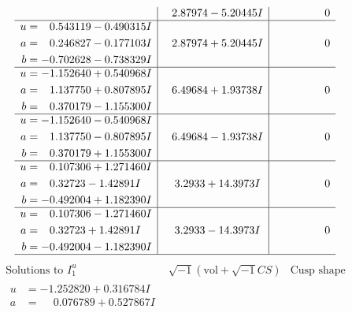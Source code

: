 \documentclass[1p]{elsarticle_modified}
\theoremstyle{definition}
\newcommand{\I}{\sqrt{-1}}
\begin{document}
$$\begin{array}{c|c|c}
 & \phantom{-}2.87974 - 5.20445 I & \phantom{-0.000000 } 0 \\ \hline\begin{aligned}
u &= \phantom{-}0.543119 - 0.490315 I \\
a &= \phantom{-}0.246827 - 0.177103 I \\
b &= -0.702628 - 0.738329 I\end{aligned}
 & \phantom{-}2.87974 + 5.20445 I & \phantom{-0.000000 } 0 \\ \hline\begin{aligned}
u &= -1.152640 + 0.540968 I \\
a &= \phantom{-}1.137750 + 0.807895 I \\
b &= \phantom{-}0.370179 - 1.155300 I\end{aligned}
 & \phantom{-}6.49684 + 1.93738 I & \phantom{-0.000000 } 0 \\ \hline\begin{aligned}
u &= -1.152640 - 0.540968 I \\
a &= \phantom{-}1.137750 - 0.807895 I \\
b &= \phantom{-}0.370179 + 1.155300 I\end{aligned}
 & \phantom{-}6.49684 - 1.93738 I & \phantom{-0.000000 } 0 \\ \hline\begin{aligned}
u &= \phantom{-}0.107306 + 1.271460 I \\
a &= \phantom{-}0.32723 - 1.42891 I \\
b &= -0.492004 + 1.182390 I\end{aligned}
 & \phantom{-}3.2933 + 14.3973 I & \phantom{-0.000000 } 0 \\ \hline\begin{aligned}
u &= \phantom{-}0.107306 - 1.271460 I \\
a &= \phantom{-}0.32723 + 1.42891 I \\
b &= -0.492004 - 1.182390 I\end{aligned}
 & \phantom{-}3.2933 - 14.3973 I & \phantom{-0.000000 } 0\\
 \hline 
 \end{array}$$\newpage$$\begin{array}{c|c|c}  
\text{Solutions to }I^u_{1}& \I (\text{vol} + \sqrt{-1}CS) & \text{Cusp shape}\\
 \hline 
\begin{aligned}
u &= -1.252820 + 0.316784 I \\
a &= \phantom{-}0.076789 + 0.527867 I \\

\end{aligned}
\end{array}$$
\end{document}
